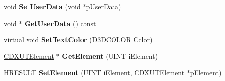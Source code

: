 \begin{DoxyCompactItemize}
\item 
\hypertarget{class_c_d_x_u_t_control_a1545674f9f77e192fb5b7151a29d5862}{void {\bfseries Set\+User\+Data} (void $\ast$p\+User\+Data)}\label{class_c_d_x_u_t_control_a1545674f9f77e192fb5b7151a29d5862}

\item 
\hypertarget{class_c_d_x_u_t_control_ae0d69e33c788ebb827c02886b1ab8ff9}{void $\ast$ {\bfseries Get\+User\+Data} () const }\label{class_c_d_x_u_t_control_ae0d69e33c788ebb827c02886b1ab8ff9}

\item 
\hypertarget{class_c_d_x_u_t_control_a9132bb5d6b1d2bff1f20df33fec8c98b}{virtual void {\bfseries Set\+Text\+Color} (D3\+D\+C\+O\+L\+O\+R Color)}\label{class_c_d_x_u_t_control_a9132bb5d6b1d2bff1f20df33fec8c98b}

\item 
\hypertarget{class_c_d_x_u_t_control_a4f6164a6360791491abcf9fdeebf3f6d}{\hyperlink{class_c_d_x_u_t_element}{C\+D\+X\+U\+T\+Element} $\ast$ {\bfseries Get\+Element} (U\+I\+N\+T i\+Element)}\label{class_c_d_x_u_t_control_a4f6164a6360791491abcf9fdeebf3f6d}

\item 
\hypertarget{class_c_d_x_u_t_control_a9aff35c5836ad9406f7ec3f8bedde0d6}{H\+R\+E\+S\+U\+L\+T {\bfseries Set\+Element} (U\+I\+N\+T i\+Element, \hyperlink{class_c_d_x_u_t_element}{C\+D\+X\+U\+T\+Element} $\ast$p\+Element)}\label{class_c_d_x_u_t_control_a9aff35c5836ad9406f7ec3f8bedde0d6}

\end{DoxyCompactItemize}

